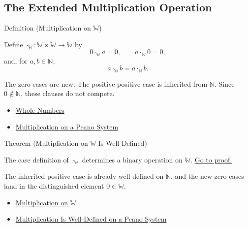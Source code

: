 \subsection*{The Extended Multiplication Operation}

\begin{definitionbox}{Definition (Multiplication on \texorpdfstring{$\mathbb{W}$}{W})}
\begin{definition}
\label{def:multiplication-on-w}
Define $\cdot_{\mathbb{W}}:\mathbb{W}\times\mathbb{W}\to\mathbb{W}$ by
\[
0\cdot_{\mathbb{W}}a=0,\qquad
a\cdot_{\mathbb{W}}0=0,
\]
and, for $a,b\in\mathbb{N}$,
\[
a\cdot_{\mathbb{W}}b=a\cdot_{\mathbb{N}}b.
\]
\end{definition}
\end{definitionbox}

\begin{remark*}[Interpretation]
The zero cases are new. The positive-positive case is inherited from
$\mathbb{N}$. Since $0\notin\mathbb{N}$, these clauses do not compete.
\end{remark*}

\begin{dependencies}
\begin{itemize}
  \item \hyperref[def:whole-numbers]{Whole Numbers}
  \item \hyperref[def:multiplication-on-peano-system]{Multiplication on a Peano System}
\end{itemize}
\end{dependencies}

\begin{theorembox}{Theorem (Multiplication on \texorpdfstring{$\mathbb{W}$}{W} Is Well-Defined)}
\begin{theorem}
\label{thm:multiplication-on-w-well-defined}
The case definition of $\cdot_{\mathbb{W}}$ determines a binary operation on
$\mathbb{W}$.
\hyperref[prf:multiplication-on-w-well-defined]{Go to proof.}
\end{theorem}
\end{theorembox}

\begin{remark*}[Interpretation]
The inherited positive case is already well-defined on $\mathbb{N}$, and the
new zero cases land in the distinguished element $0\in\mathbb{W}$.
\end{remark*}

\begin{dependencies}
\begin{itemize}
  \item \hyperref[def:multiplication-on-w]{Multiplication on $\mathbb{W}$}
  \item \hyperref[thm:multiplication-well-defined-on-peano-system]{Multiplication Is Well-Defined on a Peano System}
\end{itemize}
\end{dependencies}


